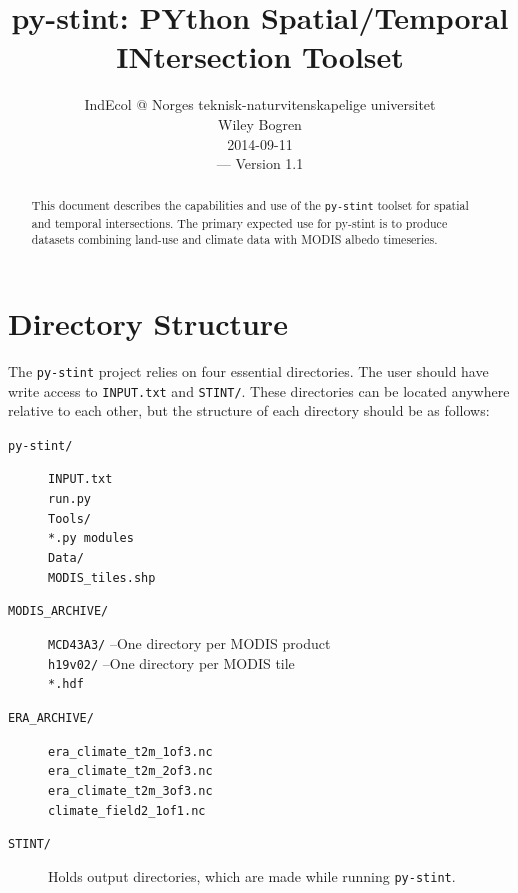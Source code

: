 \documentclass[twoside,a4paper]{refart}
\title{py-stint: PYthon Spatial/Temporal INtersection Toolset}
\author{IndEcol @ Norges teknisk-naturvitenskapelige universitet \\
Wiley Bogren \\
2014-09-11   \\
--- Version 1.1}
\date{}
\begin{document}
\maketitle

\begin{abstract}
        This document describes the capabilities and use of the 
        \texttt{py-stint} toolset for spatial and temporal 
        intersections.  The primary expected use for py-stint is 
        to produce datasets combining land-use and climate data 
        with MODIS albedo timeseries.
\end{abstract}


\tableofcontents

\newpage




\section{Directory Structure}
\label{dirs}
The \texttt{py-stint} project relies on four essential directories.  
The user should have write access to \texttt{INPUT.txt} and \texttt{STINT/}. 
These directories can be located anywhere relative to each other, but the structure of each directory should be as follows:

\begin{description}
\item[\texttt{py-stint/}]
        \texttt{INPUT.txt}\\
        \texttt{run.py}\\
        \texttt{Tools/}\\
          \-\hspace{0.5cm} \texttt{*.py modules}\\
          \-\hspace{0.5cm} \texttt{Data/}\\
            \-\hspace{1.0cm} \texttt{MODIS\_tiles.shp}

\item[\texttt{MODIS\_ARCHIVE/}]
        \texttt{MCD43A3/}  --One directory per MODIS product\\
          \-\hspace{0.5cm} \texttt{h19v02/}  --One directory per MODIS tile\\
            \-\hspace{1.0cm} \texttt{*.hdf}

\item[\texttt{ERA\_ARCHIVE/}]
        \texttt{era\_climate\_t2m\_1of3.nc}\\
        \texttt{era\_climate\_t2m\_2of3.nc}\\
        \texttt{era\_climate\_t2m\_3of3.nc}\\
        \texttt{climate\_field2\_1of1.nc}
\item[\texttt{STINT/}]
        Holds output directories, which are made while running \texttt{py-stint}.
\end{description}
\end{document}

